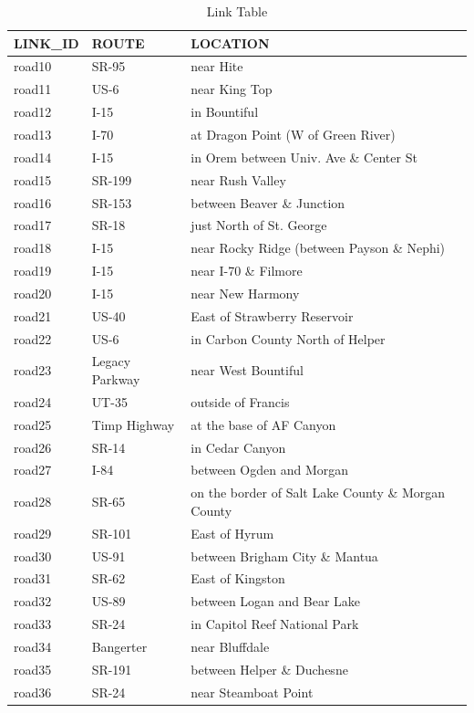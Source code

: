 \begin{table}

\caption{\label{tab:linktable}Link Table}
\centering
\begin{tabular}[t]{lll}
\toprule
LINK\_ID & ROUTE & LOCATION\\
\midrule
road10 & SR-95 & near Hite\\
road11 & US-6 & near King Top\\
road12 & I-15 & in Bountiful\\
road13 & I-70 & at Dragon Point (W of Green River)\\
road14 & I-15 & in Orem between Univ. Ave \& Center St\\
\addlinespace
road15 & SR-199 & near Rush Valley\\
road16 & SR-153 & between Beaver \& Junction\\
road17 & SR-18 & just North of St. George\\
road18 & I-15 & near Rocky Ridge (between Payson \& Nephi)\\
road19 & I-15 & near I-70 \& Filmore\\
\addlinespace
road20 & I-15 & near New Harmony\\
road21 & US-40 & East of Strawberry Reservoir\\
road22 & US-6 & in Carbon County North of Helper\\
road23 & Legacy Parkway & near West Bountiful\\
road24 & UT-35 & outside of Francis\\
\addlinespace
road25 & Timp Highway & at the base of AF Canyon\\
road26 & SR-14 & in Cedar Canyon\\
road27 & I-84 & between Ogden and Morgan\\
road28 & SR-65 & on the border of Salt Lake County \& Morgan County\\
road29 & SR-101 & East of Hyrum\\
\addlinespace
road30 & US-91 & between Brigham City \& Mantua\\
road31 & SR-62 & East of Kingston\\
road32 & US-89 & between Logan and Bear Lake\\
road33 & SR-24 & in Capitol Reef National Park\\
road34 & Bangerter & near Bluffdale\\
\addlinespace
road35 & SR-191 & between Helper \& Duchesne\\
road36 & SR-24 & near Steamboat Point\\

\end{tabular}
\end{table}
